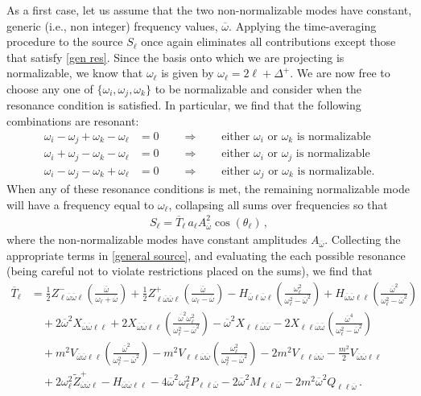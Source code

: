 \documentclass[letterpaper,11pt]{article}
\newcommand{\oi}{\omega_i}
\newcommand{\oj}{\omega_j}
\newcommand{\ok}{\omega_k}
\newcommand{\ol}{\omega_\ell}
\newcommand{\thl}{\theta_\ell}
\newcommand{\ob}{\overline{\omega}}
\begin{document}
As a first case, let us assume that the two non-normalizable modes have constant, generic (i.e., non integer) frequency values, $\ob$. Applying the time-averaging procedure to the source $S_\ell$ once again eliminates all contributions except those that satisfy \eqref{gen res}. Since the basis onto which we are projecting is normalizable, we know that $\omega_\ell$ is given by $\omega_\ell = 2\ell + \Delta^{+}$. We are now free to choose any one of $\{\omega_i, \omega_j, \ok\}$ to be normalizable and consider when the resonance condition is satisfied. In particular, we find that the following combinations are resonant:
\begin{align}
\label{gen nn res 1}
\oi - \oj + \ok - \ol &= 0 \qquad \Rightarrow \qquad \text{either $\oi$ or $\ok$ is normalizable} \\
\oi + \oj - \ok - \ol &= 0 \qquad \Rightarrow \qquad \text{either $\oi$ or $\oj$ is normalizable} \\
\oi - \oj - \ok + \ol &= 0 \qquad \Rightarrow \qquad \text{either $\oj$ or $\ok$ is normalizable.}
\label{gen nn res 2}
\end{align}
When any of these resonance conditions is met, the remaining normalizable mode will have a frequency equal to $\ol$, collapsing all sums over frequencies so that
\begin{align}
S_\ell = \overline{T}_\ell \, a_\ell A_{\ob}^2 \cos (\thl) \, ,
\end{align}
where the non-normalizable modes have constant amplitudes $A_{\ob}$. Collecting the appropriate terms in \eqref{general source}, and evaluating the each possible resonance (being careful not to violate restrictions placed on the sums), we find that
\begin{align}
\label{S:2NN}
\overline{T}_\ell &= \frac{1}{2} Z^{-}_{\ell \ob \ob \ell} \left( \frac{\ob}{\ol + \ob} \right) + \frac{1}{2} Z^{+}_{\ell \ob \ob \ell} \left( \frac{\ob}{\ol - \ob} \right) - H_{\ob \ell \ob \ell} \left( \frac{\ol^2}{\ol^2 - \ob^2} \right) + H_{\ob \ob \ell \ell} \left( \frac{\ob^2}{\ol^2 - \ob^2} \right) \nonumber \\
%
& \quad + 2 \ob^2 X_{\ob \ob \ell \ell} + 2 X_{\ob \ob \ell \ell} \left( \frac{{\ob}^2 \ol^2}{\ol^2 - \ob^2} \right) - \ob^2 X_{\ell \ell \ob \ob} - 2 X_{\ell \ell \ob \ob}  \left( \frac{\ob^4}{\ol^2 - \ob^2} \right) \nonumber \\
% 
& \quad + m^2 V_{\ob \ob \ell \ell} \left( \frac{\ob^2}{\ol^2 - \ob^2} \right) - m^2 V_{\ell \ell \ob \ob} \left( \frac{\ol^2}{\ol^2 - \ob^2} \right) - 2m^2 V_{\ell \ell \ob \ob} - \frac{m^2}{2} V_{\ob \ob \ell \ell}  \nonumber \\
%
& \quad + 2 \ol^2 \tilde{Z}^+_{\ob \ob \ell} - H_{\ob \ob \ell \ell} - 4 \ob^2 \ol^2 P_{\ell \ell \ob} -2 \ob^2 M_{\ell \ell \ob} - 2 m^2 \ob^2 Q_{\ell \ell \ob} \, .
\end{align}
\end{document}

